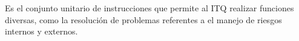     Es el conjunto unitario de instrucciones que permite al ITQ realizar funciones diversas, como la resolución de problemas referentes a el manejo de riesgos internos y externos.
